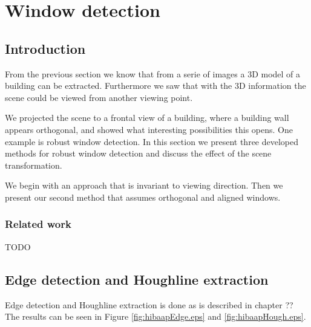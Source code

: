 %
%




\section{Window detection}







\label{chap:windowDetection}
\subsection{Introduction}
From the previous section we know that from a serie of images a 3D model of a
building can be extracted. Furthermore we saw that with the 3D information the
scene could be viewed from another viewing point. 

We projected the scene to a frontal view of a building, where a building wall appears
orthogonal, and showed what interesting possibilities this opens.
One example is robust window detection.
In this section we present three developed methods for robust window detection
and discuss the effect of the scene transformation.

We begin with an approach that is invariant to viewing direction.  Then we
present our second method that assumes orthogonal and aligned windows.


\subsubsection{Related work}
TODO

\subsection{Edge detection and Houghline extraction} 
Edge detection and Houghline extraction is done as is described in chapter ??
The results can be seen in Figure \ref{fig:hibaapEdge.eps} and
\ref{fig:hibaapHough.eps}.
